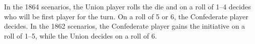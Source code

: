 
In the 1864 scenarios, the Union player rolls the die and on a roll of 1--4 decides who will be first player for the turn. On a roll of 5 or 6, the Confederate player decides. In the 1862 scenarios, the Confederate player gains the initiative on a roll of 1--5, while the Union decides on a roll of 6.
